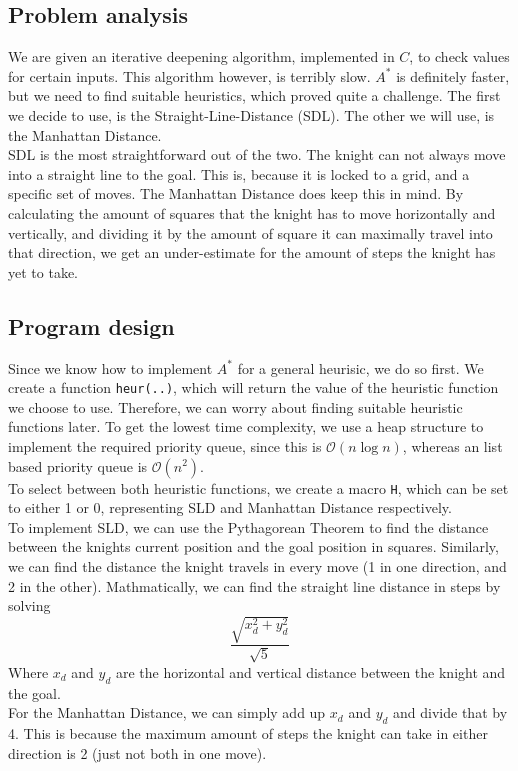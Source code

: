 \documentclass{article}
\begin{document}
	\subsection*{Problem analysis}
	We are given an iterative deepening algorithm, implemented in $C$, to check values for certain inputs. This algorithm however, is terribly slow. $A^*$ is definitely faster, but we need to find suitable heuristics, which proved quite a challenge. The first we decide to use, is the Straight-Line-Distance (SDL). The other we will use, is the Manhattan Distance.\\ SDL is the most straightforward out of the two. The knight can not always move into a straight line to the goal. This is, because it is locked to a grid, and a specific set of moves. The Manhattan Distance does keep this in mind. By calculating the amount of squares that the knight has to move horizontally and vertically, and dividing it by the amount of square it can maximally travel into that direction, we get an under-estimate for the amount of steps the knight has yet to take.
	
	\subsection*{Program design}
	Since we know how to implement $A^*$ for a general heurisic, we do so first. We create a function \verb|heur(..)|, which will return the value of the heuristic function we choose to use. Therefore, we can worry about finding suitable heuristic functions later. To get the lowest time complexity, we use a heap structure to implement the required priority queue, since this is $\mathcal{O}(n\log{}n)$, whereas an list based priority queue is $\mathcal{O}(n^2)$.\\
	To select between both heuristic functions, we create a macro \verb|H|, which can be set to either 1 or 0, representing SLD and Manhattan Distance respectively. \\
	To implement SLD, we can use the Pythagorean Theorem to find the distance between the knights current position and the goal position in squares. Similarly, we can find the distance the knight travels in every move (1 in one direction, and 2 in the other). Mathmatically, we can find the straight line distance in steps by solving
	$$ \frac{\sqrt{x_d^2+y_d^2}}{\sqrt{5}} $$
	Where $x_d$ and $y_d$ are the horizontal and vertical distance between the knight and the goal.\\
	For the Manhattan Distance, we can simply add up $x_d$ and $y_d$ and divide that by 4. This is because the maximum amount of steps the knight can take in either direction is 2 (just not both in one move). 
	
\end{document}
